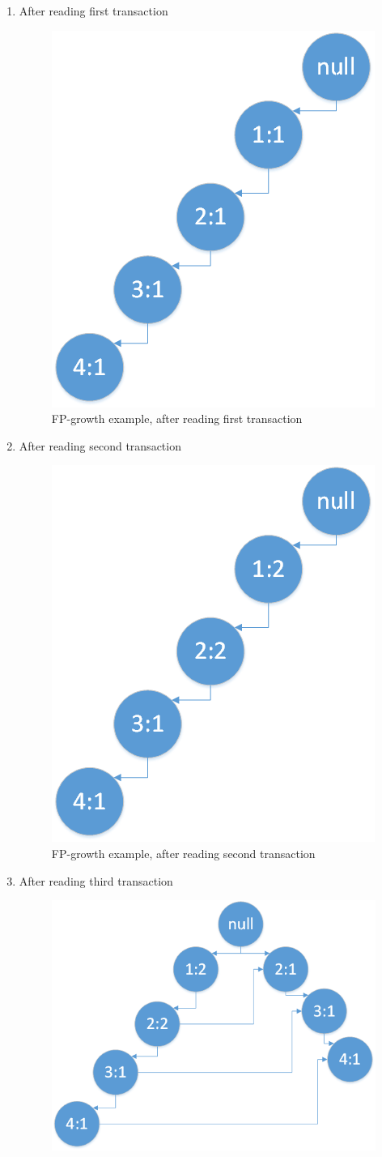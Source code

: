 \begin{enumerate}
	\item After reading first transaction 
	\begin{figure}[H]
		\begin{center}
			\includegraphics[width=0.4\linewidth]{images/fp1.png}
			\caption{FP-growth example, after reading first transaction}
			\label{fp_1}
		\end{center}
	\end{figure}
	\item After reading second transaction 
		\begin{figure}[H]
			\begin{center}
				\includegraphics[width=0.4\linewidth]{images/fp2.png}
				\caption{FP-growth example, after reading second transaction}
				\label{fp_2}
			\end{center}
		\end{figure}
			\item After reading third transaction 
			\begin{figure}[H]
				\begin{center}
					\includegraphics[width=0.4\linewidth]{images/fp3.png}

\end{center}
\end{figure}
\end{enumerate}
